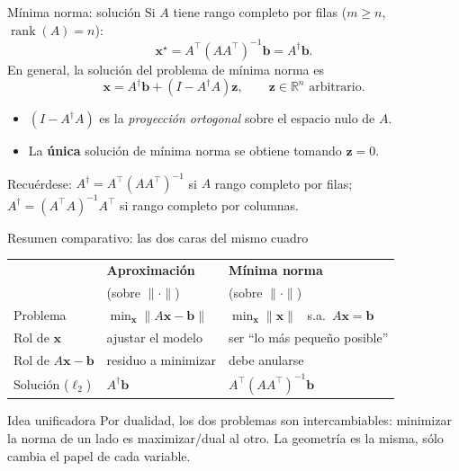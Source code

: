 \documentclass[10pt,aspectratio=169]{beamer}
\newcommand{\R}{\mathbb{R}}
\newcommand{\x}{\mathbf{x}}
\newcommand{\xb}{\mathbf{b}}
\newcommand{\z}{\mathbf{z}}
\newcommand{\0}{\mathbf{0}}
\newcommand{\1}{\mathbf{1}}
\begin{document}
\begin{frame}{Mínima norma: solución}
  Si $A$ tiene rango completo por filas ($m\ge n$, $\operatorname{rank}(A)=n$):
  \[
    \x^\star = A^\top(AA^\top)^{-1}\xb = A^\dagger\xb.
  \]
  En general, la solución del problema de mínima norma es
  \[
    \x = A^\dagger \xb + (I - A^\dagger A)\z, \qquad \z\in\R^n\text{ arbitrario}.
  \]
  \begin{itemize}
    \item $(I - A^\dagger A)$ es la \emph{proyección ortogonal} sobre el
          espacio nulo de $A$.
    \item La \textbf{única} solución de mínima norma se obtiene tomando $\z=0$.
  \end{itemize}
  \begin{block}{Recuérdese:}
    $A^\dagger = A^\top(A A^\top)^{-1}$ si $A$ rango completo por filas;\\
    $A^\dagger = (A^\top A)^{-1}A^\top$ si rango completo por columnas.
  \end{block}
\end{frame}

\begin{frame}{Resumen comparativo: las dos caras del mismo cuadro}
  \begin{center}
    \begin{tabular}{lll}
      \toprule
       & \textbf{Aproximación} & \textbf{Mínima norma} \\
       & (sobre $\|\cdot\|$) & (sobre $\|\cdot\|$) \\
      \midrule
      Problema & $\min_\x \|A\x-\xb\|$ & $\min_\x \|\x\|$ \ s.a.\ $A\x=\xb$ \\[0.3em]
      Rol de $\x$ & ajustar el modelo & ser ``lo más pequeño posible'' \\
      Rol de $A\x-\xb$ & residuo a minimizar & debe anularse \\
      Solución ($\ell_2$) & $A^\dagger \xb$ & $A^\top(AA^\top)^{-1}\xb$ \\
      \bottomrule
    \end{tabular}
  \end{center}
  \vspace{0.3em}
  \begin{alertblock}{Idea unificadora}
    Por dualidad, los dos problemas son intercambiables: minimizar la
    norma de un lado es maximizar/dual al otro. La geometría es la misma,
    sólo cambia el papel de cada variable.
  \end{alertblock}
\end{frame}
\end{document}
